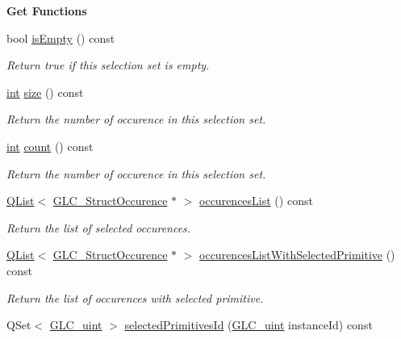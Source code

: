 \begin{Indent}{\bf Get Functions}\par
\begin{DoxyCompactItemize}
\item 
bool \hyperlink{class_g_l_c___selection_set_ad31c2a9af019f84f6a67db4fdb28428a}{is\-Empty} () const 
\begin{DoxyCompactList}\small\item\em Return true if this selection set is empty. \end{DoxyCompactList}\item 
\hyperlink{ioapi_8h_a787fa3cf048117ba7123753c1e74fcd6}{int} \hyperlink{class_g_l_c___selection_set_a21abb44047b7700fbd924e424b9ce5ea}{size} () const 
\begin{DoxyCompactList}\small\item\em Return the number of occurence in this selection set. \end{DoxyCompactList}\item 
\hyperlink{ioapi_8h_a787fa3cf048117ba7123753c1e74fcd6}{int} \hyperlink{class_g_l_c___selection_set_aba67276a133aea5f90f76ad5f1292c31}{count} () const 
\begin{DoxyCompactList}\small\item\em Return the number of occurence in this selection set. \end{DoxyCompactList}\item 
\hyperlink{class_q_list}{Q\-List}$<$ \hyperlink{class_g_l_c___struct_occurence}{G\-L\-C\-\_\-\-Struct\-Occurence} $\ast$ $>$ \hyperlink{class_g_l_c___selection_set_a7606199cf5bb15ddd48f05bc9d45f089}{occurences\-List} () const 
\begin{DoxyCompactList}\small\item\em Return the list of selected occurences. \end{DoxyCompactList}\item 
\hyperlink{class_q_list}{Q\-List}$<$ \hyperlink{class_g_l_c___struct_occurence}{G\-L\-C\-\_\-\-Struct\-Occurence} $\ast$ $>$ \hyperlink{class_g_l_c___selection_set_a545611a441d387790845f27e5b797d8e}{occurences\-List\-With\-Selected\-Primitive} () const 
\begin{DoxyCompactList}\small\item\em Return the list of occurences with selected primitive. \end{DoxyCompactList}\item 
Q\-Set$<$ \hyperlink{glc__global_8h_abf950976fabed69026558df8e2da6c6b}{G\-L\-C\-\_\-uint} $>$ \hyperlink{class_g_l_c___selection_set_acdfa5acae6d279579ffc591098ea96ac}{selected\-Primitives\-Id} (\hyperlink{glc__global_8h_abf950976fabed69026558df8e2da6c6b}{G\-L\-C\-\_\-uint} instance\-Id) const 

\end{DoxyCompactItemize}
\end{Indent}
